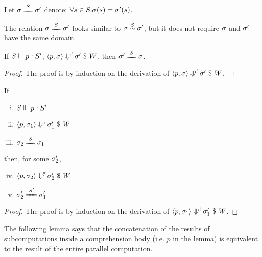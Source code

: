 \begin{nota}
Let $\sgm \ConEq{\S} \sgm'$ denote: $\forall s \in S. \sigma(s) = \sigma'(s)$.
\end{nota}
The relation $\sgm \ConEq{\S} \sgm'$ looks similar to $\sigma \stackrel{S}{\sim} \sigma'$, but it does not require $\sigma$ and $\sigma'$ have the same domain.

\begin{lem}\label{lem-}
	If $S \Vdash p : S'$, $\left\langle p,\sigma \right\rangle \Downarrow^{\vec c} \sigma' \ \$ \ W$, then $\sgm' \ConEq{\S} \sgm$.
\end{lem}
\begin{proof}
	The proof is by induction on the derivation of $\left\langle p,\sigma \right\rangle \Downarrow^{\vec c} \sigma' \ \$ \ W$.
\end{proof}


\begin{lem} \label{lem-emp-join}
	If 
	\begin{enumerate} [(i)]
		\item $S \Vdash p : S'$
		\item $\left\langle p,\sigma_1 \right\rangle \Downarrow^{\vec c} \sigma_1' \ \$ \ W$
		\item $\sgm_2 \ConEq{S} \sgm_1$
	\end{enumerate}
	then, for some $\sigma_2'$,  
	\begin{enumerate}[(i)]
		\setcounter{enumi}{3}
		\item $\left\langle p,\sigma_2 \right\rangle \Downarrow^{\vec c} \sigma_2' \ \$ \ W$
		\item $\sgm_2' \ConEq{\S'} \sgm_1'$
	\end{enumerate}
\end{lem}
\begin{proof}
	The proof is by induction on the derivation of $\left\langle p,\sigma_1 \right\rangle \Downarrow^{\vec c} \sigma_1' \ \$ \ W$. 
\end{proof}


The following lemma says that the concatenation of the results of  subcomputations inside a comprehension body (i.e. $p$ in the lemma) is equivalent to the result of the entire parallel computation. 

